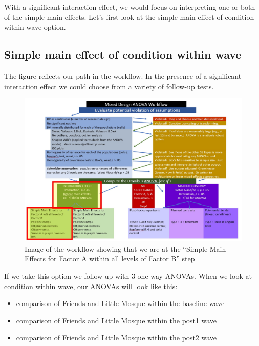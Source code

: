 \documentclass[
  11pt,
]{book}
\providecommand{\tightlist}{%
  \setlength{\itemsep}{0pt}\setlength{\parskip}{0pt}}
\begin{document}
With a significant interaction effect, we would focus on interpreting one or both of the simple main effects. Let's first look at the simple main effect of condition within wave option.

\hypertarget{simple-main-effect-of-condition-within-wave}{%
\subsection{Simple main effect of condition within wave}\label{simple-main-effect-of-condition-within-wave}}

The figure reflects our path in the workflow. In the presence of a significant interaction effect we could choose from a variety of follow-up tests.

\begin{figure}
\centering
\includegraphics{images/mixed/mx_SimpleMainA.jpg}
\caption{Image of the workflow showing that we are at the ``Simple Main Effects for Factor A within all levels of Factor B'' step}
\end{figure}

If we take this option we follow up with 3 one-way ANOVAs. When we look at condition within wave, our ANOVAs will look like this:

\begin{itemize}
\tightlist
\item
  comparison of Friends and Little Mosque within the baseline wave
\item
  comparison of Friends and Little Mosque within the post1 wave
\item
  comparison of Friends and Little Mosque within the post2 wave
\end{itemize}
\end{document}
